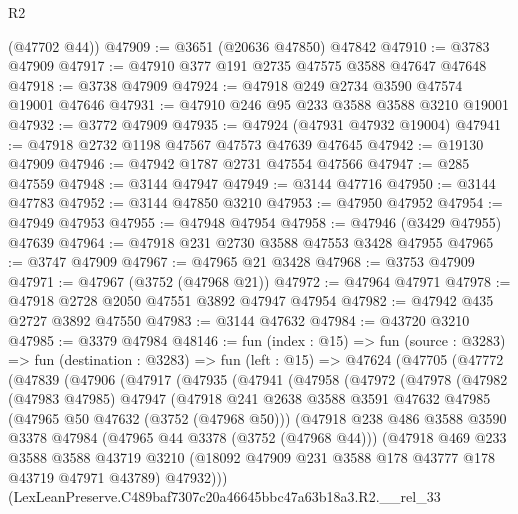 \begin{lexlean}{R2}
\begin{coremodule}
      (@47702 @44))
@47909 := @3651 (@20636 @47850) @47842
@47910 := @3783 @47909
@47917 := @47910 @377 @191 @2735 @47575 @3588 @47647 @47648
@47918 := @3738 @47909
@47924 := @47918 @249 @2734 @3590 @47574 @19001 @47646
@47931 := @47910 @246 @95 @233 @3588 @3588 @3210 @19001
@47932 := @3772 @47909
@47935 := @47924 (@47931 @47932 @19004)
@47941 := @47918 @2732 @1198 @47567 @47573 @47639 @47645
@47942 := @19130 @47909
@47946 := @47942 @1787 @2731 @47554 @47566
@47947 := @285 @47559
@47948 := @3144 @47947
@47949 := @3144 @47716
@47950 := @3144 @47783
@47952 := @3144 @47850 @3210
@47953 := @47950 @47952
@47954 := @47949 @47953
@47955 := @47948 @47954
@47958 := @47946 (@3429 @47955) @47639
@47964 := @47918 @231 @2730 @3588 @47553 @3428 @47955
@47965 := @3747 @47909
@47967 := @47965 @21 @3428
@47968 := @3753 @47909
@47971 := @47967 (@3752 (@47968 @21))
@47972 := @47964 @47971
@47978 := @47918 @2728 @2050 @47551 @3892 @47947 @47954
@47982 := @47942 @435 @2727 @3892 @47550
@47983 := @3144 @47632
@47984 := @43720 @3210
@47985 := @3379 @47984
@48146 := fun (index : @15) =>
  fun (source : @3283) =>
  fun (destination : @3283) =>
  fun (left : @15) =>
  @47624
    (@47705
      (@47772
        (@47839
          (@47906
            (@47917
              (@47935
                (@47941
                  (@47958
                    (@47972
                      (@47978
                        (@47982
                          (@47983 @47985)
                          @47947
                          (@47918
                            @241
                            @2638
                            @3588
                            @3591
                            @47632
                            @47985
                            (@47965 @50 @47632 (@3752 (@47968 @50)))
                            (@47918
                              @238
                              @486
                              @3588
                              @3590
                              @3378
                              @47984
                              (@47965 @44 @3378 (@3752 (@47968 @44)))
                              (@47918
                                @469
                                @233
                                @3588
                                @3588
                                @43719
                                @3210
                                (@18092 @47909 @231 @3588 @178 @43777 @178 @43719 @47971 @43789)
                                @47932)))
                          (LexLeanPreserve.C489baf7307c20a46645bbc47a63b18a3.R2.__rel_33

\end{coremodule}
\end{lexlean}
